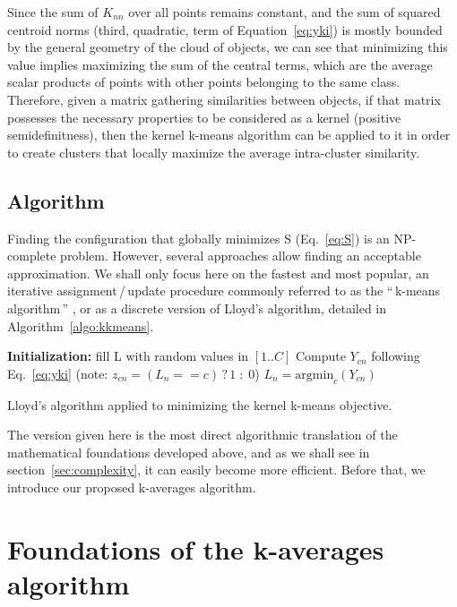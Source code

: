 \documentclass[10pt,letterpaper]{article}
\newcommand{\gl}[1]{``\,#1\,''} %
\begin{document}
Since the sum of $K_{nn}$ over all points remains constant, and the sum of squared centroid norms (third, quadratic, term of Equation~\ref{eq:yki}) is mostly bounded by the general geometry of the cloud of objects, we can see that minimizing this value implies maximizing the sum of the central terms, which are the average scalar products of points with other points belonging to the same class. Therefore, given a matrix gathering similarities between objects, if that matrix possesses the necessary properties to be considered as a kernel (positive semidefinitness), then the kernel k-means algorithm can be applied to it in order to create clusters that locally maximize the average intra-cluster similarity.

\subsection{Algorithm}

Finding the configuration that globally minimizes S (Eq.~\ref{eq:S}) is an NP-complete problem. However, several approaches allow finding an acceptable approximation. We shall only focus here on the fastest and most popular, an iterative assignment\,/\,update procedure commonly referred to as the \gl{k-means algorithm} \cite{macQueenBsmsp67}, or as a discrete version of Lloyd's algorithm, detailed in Algorithm~\ref{algo:kkmeans}.

\begin{algorithm}
	\SetAlgoLined
	\BlankLine
	\textbf{Initialization:} fill L with random values in $[1..C]$\;
	\BlankLine
	 {
		 {
			 {
				Compute $Y_{cn}$ following Eq.~\ref{eq:yki} \label{algline:kkmeans_cplx1}
				(note: $z_{cn} = (L_n == c)\,?\,1\;:\;0$)
			}
			$L_n = \textrm{argmin}_c (Y_{cn})$\;
		}
	}
	\BlankLine
	\caption{Lloyd's algorithm applied to minimizing the kernel k-means objective.}
  \label{algo:kkmeans}
\end{algorithm}

The version given here is the most direct algorithmic translation of the mathematical foundations developed above, and as we shall see in section~\ref{sec:complexity}, it can easily become more efficient. Before that, we introduce our proposed k-averages algorithm.


\section{Foundations of the k-averages algorithm} \label{sec:kaverages}
\end{document}
